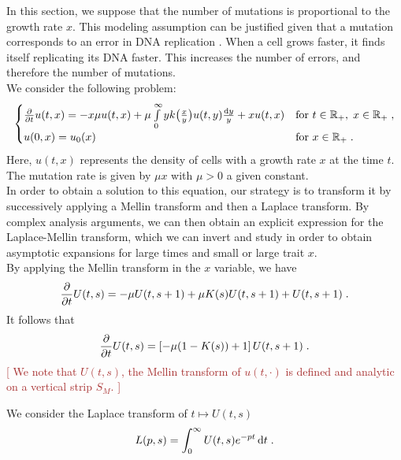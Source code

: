 \documentclass[11pt]{amsart}
\newcommand{\diff}{\,\mathrm{d}}
\newcommand{\ndr}[1]{\textcolor{brown}{[#1]}}
\begin{document}
In this section, we suppose that the number of mutations is proportional to the growth rate $x$. This modeling assumption can be justified given that a mutation corresponds to an error in DNA replication \cite{pray2008dna}. When a cell grows faster, it finds itself replicating its DNA faster. This increases the number of errors, and therefore the number of mutations.\\

We consider the following problem:
\begin{equation}
    \begin{cases}
	\frac{\partial}{\partial t}u(t,x) = - x\mu u(t,x) + \mu \int\limits_{0}^{\infty} y k\big( \frac{x}{y}\big) u(t,y) \frac{\mathrm dy}{y} + xu(t,x)
	& \text{for }t \in \mathbb{R}_+, \; x \in \mathbb{R}_+ \; ,
	\\
	u(0, x) = u_0(x)
	& \text{for }x \in \mathbb{R}_+
	\; .
    \end{cases}
    \label{eq:linearmutrate}
\end{equation}
Here, $u(t,x)$ represents the density of cells with a growth rate $x$ at the time $t$. The mutation rate is given by $\mu x$ with $\mu>0$ a given constant. \\

In order to obtain a solution to this equation, our strategy is to transform it by successively applying a Mellin transform and then a Laplace transform. By complex analysis arguments, we can then obtain an explicit expression for the Laplace-Mellin transform, which we can invert and study in order to obtain asymptotic expansions for large times and small or large trait $x$. \\

By applying the Mellin transform in the $x$ variable, we have
	\begin{equation*}
		\frac{\partial}{\partial t} U(t,s) = - \mu U(t,s+1) + \mu K(s) U(t,s+1) + U(t,s+1)
		\; .
	\end{equation*}
It follows that
    \begin{equation}
        \frac{\partial}{\partial t} U(t,s) = \left[- \mu (1-K(s)) + 1\right] U(t,s+1)
		\; .
        \label{eq:addgrowtheasy}
    \end{equation}
    \ndr{
We note that $U(t,s)$, the Mellin transform of $u(t,\cdot)$ is defined and analytic on a vertical strip $S_M$. }

We consider the Laplace transform of $t \mapsto U(t,s)$
\begin{align}
    L(p,s) = \int_0^\infty U(t,s)e^{-pt}\diff t
    \eqfinp
\end{align}
\end{document}
